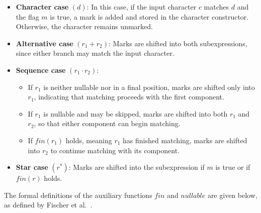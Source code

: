 \documentclass[12pt]{article}
\newcommand{\fin}{\textit{fin}}
\newcommand{\nullable}{\textit{nullable}}
\begin{document}
\begin{itemize}
  \item \textbf{Character case} $(d)$:  
  In this case, if the input character $c$ matches $d$ and the flag $m$ is true, a mark 
  is added and stored in the character constructor. Otherwise, the character remains unmarked.  

  \item \textbf{Alternative case} $(r_1 + r_2)$:  
  Marks are shifted into both subexpressions, since either branch may match the input character.  

  \item \textbf{Sequence case} $(r_1 \cdot r_2)$:  
  \begin{itemize}
    \item If $r_1$ is neither nullable nor in a final position, marks are shifted only into $r_1$,  
          indicating that matching proceeds with the first component.  
    \item If $r_1$ is nullable and may be skipped, marks are shifted into both $r_1$ and $r_2$,  
          so that either component can begin matching.  
    \item If $\fin(r_1)$ holds, meaning $r_1$ has finished matching, marks are shifted into $r_2$  
          to continue matching with its component.  
  \end{itemize}

  \item \textbf{Star case} $(r^*)$:  
  Marks are shifted into the subexpression if $m$ is true or if $\fin(r)$ holds.  
\end{itemize}

The formal definitions of the auxiliary functions $\fin$ and $\nullable$ are given below, 
as defined by Fischer et al.~\cite{Fischer2010}.
\end{document}
